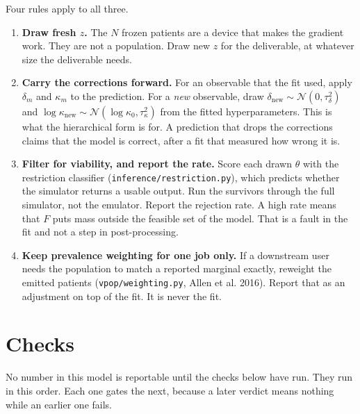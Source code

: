 \documentclass[11pt]{article}
\newcommand{\Ncal}{\mathcal{N}}
\begin{document}
Four rules apply to all three.

\begin{enumerate}
\item \textbf{Draw fresh $z$.} The $N$ frozen patients are a device that makes
      the gradient work. They are not a population. Draw new $z$ for the
      deliverable, at whatever size the deliverable needs.
\item \textbf{Carry the corrections forward.} For an observable that the fit
      used, apply $\delta_m$ and $\kappa_m$ to the prediction. For a \emph{new}
      observable, draw $\delta_{\text{new}}\sim\Ncal(0,\tau_\delta^2)$ and
      $\log\kappa_{\text{new}}\sim\Ncal(\log\kappa_0,\tau_\kappa^2)$ from the
      fitted hyperparameters. This is what the hierarchical form is for. A
      prediction that drops the corrections claims that the model is correct,
      after a fit that measured how wrong it is.
\item \textbf{Filter for viability, and report the rate.} Score each drawn
      $\theta$ with the restriction classifier
      (\texttt{inference/restriction.py}), which predicts whether the simulator
      returns a usable output. Run the survivors through the full simulator, not
      the emulator. Report the rejection rate. A high rate means that $F$ puts
      mass outside the feasible set of the model. That is a fault in the fit and
      not a step in post-processing.
\item \textbf{Keep prevalence weighting for one job only.} If a downstream user
      needs the population to match a reported marginal exactly, reweight the
      emitted patients (\texttt{vpop/weighting.py}, Allen et al. 2016). Report
      that as an adjustment on top of the fit. It is never the fit.
\end{enumerate}

\section{Checks}
\label{sec:checks}

No number in this model is reportable until the checks below have run. They run
in this order. Each one gates the next, because a later verdict means nothing
while an earlier one fails.
\end{document}
